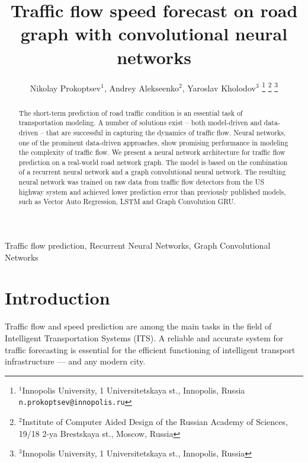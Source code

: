 \documentclass[letterpaper, 10 pt, conference]{ieeeconf}  %
\title{\LARGE \bf
Traffic flow speed forecast on road graph with convolutional neural networks}
\author{Nikolay Prokoptsev$^{1}$, Andrey Alekseenko$^{2}$, Yaroslav Kholodov$^{3}$%
\thanks{$^{1}$Innopolis University, 1 Universitetskaya st., Innopolis, Russia
        {\tt\small n.prokoptsev@innopolis.ru}}%
\thanks{$^{2}$Institute of Computer Aided Design of the Russian Academy of Sciences, 19/18 2-ya Brestskaya st.,  Moscow, Russia}%
\thanks{$^{3}$Innopolis University, 1 Universitetskaya st., Innopolis, Russia}
}
\begin{document}
\maketitle
\thispagestyle{empty}
\pagestyle{empty}


\begin{abstract}

The short-term prediction of road traffic condition is an essential task of transportation modeling. A number of solutions exist -- both model-driven and data-driven -- that are successful in capturing the dynamics of traffic flow. Neural networks, one of the prominent data-driven approaches, show promising performance in modeling the complexity of traffic flow. We present a neural network architecture for traffic flow prediction on a real-world road network graph. The model is based on the combination of a recurrent neural network and a graph convolutional neural network. The resulting neural network was trained on raw data from traffic flow detectors from the US highway system and achieved lower prediction error than previously published models, such as Vector Auto Regression, LSTM and Graph Convolution GRU.
\end{abstract}

\begin{keywords}
Traffic flow prediction, Recurrent Neural Networks, Graph Convolutional Networks
\end{keywords}


\section{Introduction}
Traffic flow and speed prediction are among the main tasks in the field of Intelligent Transportation Systems (ITS). A reliable and accurate system for traffic forecasting is essential for the efficient functioning of intelligent transport infrastructure --- and any modern city.
\end{document}
